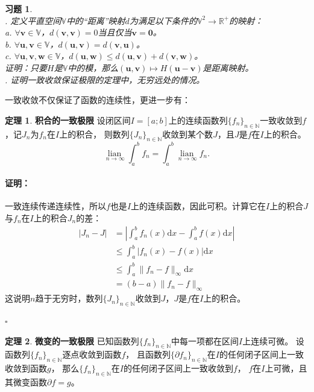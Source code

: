 \documentclass[12pt,UTF8]{ctexbook}
\newcommand{\lian}[1]{
    \underset{#1}{\operatorname{lian}\,}
}
\theoremstyle{definition}
\newtheorem{tm}{定理}[section]
\theoremstyle{plain}
\newtheorem{xt}{习题}[section]
\renewenvironment{proof}{\paragraph{\textbf{证明：}}}{\hfill$\square$}
\begin{document}
\begin{appendix}
\begin{xt}
    \mbox{} \\
    . 定义平直空间$\mathbb{V}$中的“距离”映射$d$为满足以下条件的$\mathbb{V}^2 \rightarrow \mathbb{R}^+$的映射：\\
    \indent \indent a. $\forall \mathbf{v} \in \mathbb{V}$，$d(\mathbf{v}, \mathbf{v}) = 0$当且仅当$\mathbf{v} = \mathbf{0}$。\\
    \indent \indent b. $\forall \mathbf{u}, \mathbf{v} \in \mathbb{V}$，$d(\mathbf{u}, \mathbf{v}) = d(\mathbf{v}, \mathbf{u})$。\\
    \indent \indent c. $\forall \mathbf{u}, \mathbf{v}, \mathbf{w} \in \mathbb{V}$，$d(\mathbf{u}, \mathbf{w}) \leqslant d(\mathbf{u}, \mathbf{v}) + d(\mathbf{v}, \mathbf{w})$。\\
    \indent 证明：只要$H$是$\mathbb{V}$中的模，那么$(\mathbf{u}, \mathbf{v})\mapsto H(\mathbf{u} - \mathbf{v})$是距离映射。\\
    . 证明一致收敛保证极限的定理中，无穷远处的情况。
\end{xt}

一致收敛不仅保证了函数的连续性，更进一步有：

\begin{tm}{\textbf{积合的一致极限}}
    设闭区间$I=[a;b]$上的连续函数列$\{f_n\}_{n\in\mathbb{N}}$一致收敛到$f$，记$J_n$为$f_n$在$I$上的积合，
    则数列$\{J_n\}_{n\in\mathbb{N}}$收敛到某个数$J$，且$J$是$f$在$I$上的积合。
    $$ \lian{n\to \infty} \int_a^b f_n = \int_a^b \lian{n\to\infty} f_n. $$
\end{tm}

\begin{proof}
    一致连续传递连续性，所以$f$也是$I$上的连续函数，因此可积。计算它在$I$上的积合$J$与$f_n$在$I$上的积合$J_n$的差：
    \begin{align*}
        |J_n - J| &= \left|\int_a^b f_n(x)\mathrm{d}x - \int_a^b f(x)\mathrm{d}x \right| \\
        &\leqslant \int_a^b \left| f_n(x) - f(x)\right| \mathrm{d}x \\
        &\leqslant \int_a^b \| f_n - f\|_{\infty} \mathrm{d}x \\
        &= (b - a) \| f_n - f\|_{\infty}
    \end{align*}
    这说明$n$趋于无穷时，数列$\{J_n\}_{n\in\mathbb{N}}$收敛到$J$，$J$是$f$在$I$上的积合。

\end{proof}

\begin{tm}{\textbf{微变的一致极限}}
    已知函数列$\{f_n\}_{n\in\mathbb{N}}$中每一项都在区间$I$上连续可微。
    设函数列$\{f_n\}_{n\in\mathbb{N}}$逐点收敛到函数$f$，
    且函数列$\{\partial f_n\}_{n\in\mathbb{N}}$在$I$的任何闭子区间上一致收敛到函数$g$，
    那么$\{f_n\}_{n\in\mathbb{N}}$在$I$的任何闭子区间上一致收敛到$f$，
    $f$在$I$上可微，且其微变函数$\partial f = g$。


\end{tm}
\end{appendix}
\end{document}
